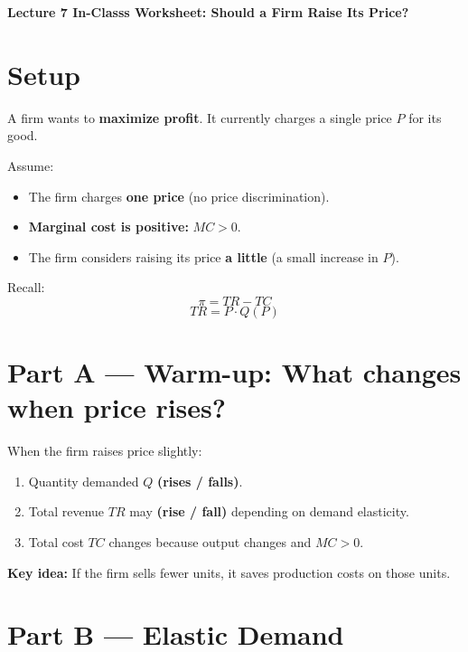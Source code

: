 \documentclass[11pt]{article}
\begin{document}
\begin{center}
    {\Large \textbf{Lecture 7 In-Classs Worksheet: Should a Firm Raise Its Price?}}
\end{center}

\vspace{1em}

\section*{Setup}

A firm wants to \textbf{maximize profit}. It currently charges a single price $P$ for its good.

Assume:
\begin{itemize}
    \item The firm charges \textbf{one price} (no price discrimination).
    \item \textbf{Marginal cost is positive:} $MC > 0$.
    \item The firm considers raising its price \textbf{a little} (a small increase in $P$).
\end{itemize}

Recall:
\[
    \pi = TR - TC
\]
\[
    TR = P \cdot Q(P)
\]

\vspace{1em}

\section*{Part A — Warm-up: What changes when price rises?}

When the firm raises price slightly:

\begin{enumerate}[label=\arabic*.]
    \item Quantity demanded $Q$ \textbf{(rises / falls)}.
    \item Total revenue $TR$ may \textbf{(rise / fall)} depending on demand elasticity.
    \item Total cost $TC$ changes because output changes and $MC > 0$.
\end{enumerate}

\textbf{Key idea:} If the firm sells fewer units, it saves production costs on those units.

\vspace{1em}

\section*{Part B — Elastic Demand}
\end{document}

